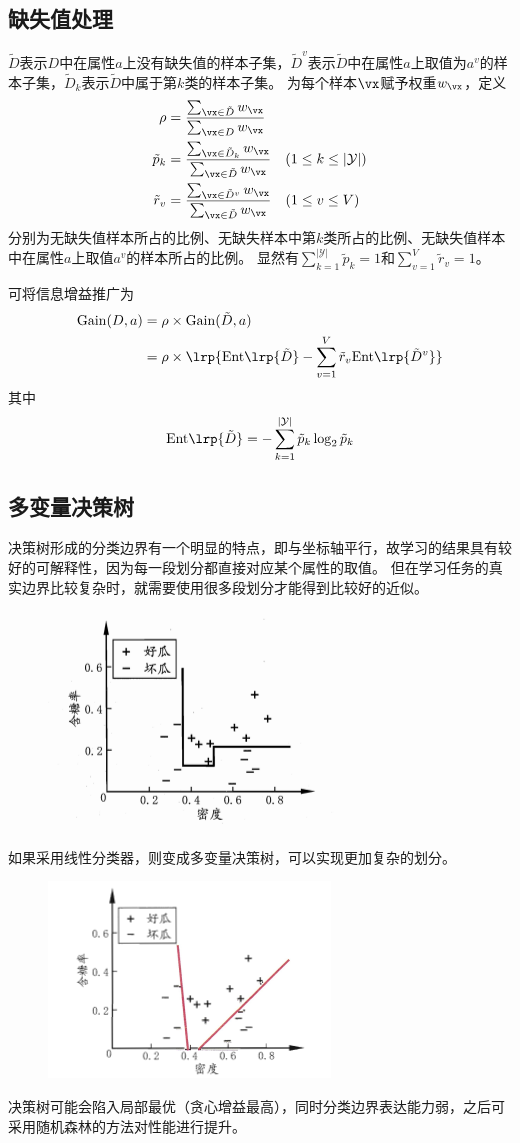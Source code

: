 \subsection{缺失值处理}
$\tilde{D}$表示$D$中在属性$a$上没有缺失值的样本子集，$\tilde{D}^v$表示$\tilde{D}$中在属性$a$上取值为$a^v$的样本子集，$\tilde{D}_k$表示$\tilde{D}$中属于第$k$类的样本子集。
为每个样本$\vx$赋予权重$w_\vx$，定义
\[\begin{aligned}
\rho &= \frac{\sum_{\vx\in\tilde{D}}w_{\vx}}{\sum_{\vx\in D}w_{\vx}}\\
\tilde{p}_k &= \frac{\sum_{\vx\in\tilde{D}_k}w_{\vx}}{\sum_{\vx\in\tilde{D}}w_{\vx}}\quad(1\leq k\leq |\mathcal{Y}|)\\
\tilde{r}_v &= \frac{\sum_{\vx\in\tilde{D}^v}w_{\vx}}{\sum_{\vx\in\tilde{D}}w_{\vx}}\quad(1\leq v\leq V)
\end{aligned}\]
分别为无缺失值样本所占的比例、无缺失样本中第$k$类所占的比例、无缺失值样本中在属性$a$上取值$a^v$的样本所占的比例。
显然有$\sum_{k=1}^{|\mathcal{Y}|}\tilde{p}_k=1$和$\sum_{v=1}^V\tilde{r}_v=1$。

可将信息增益推广为
\[\begin{aligned}
\mathrm{Gain}(D,a) &= \rho\times \mathrm{Gain}(\tilde{D},a)\\
&= \rho\times\lrp{\mathrm{Ent}\lrp{\tilde{D}}-\sum_{v=1}^V\tilde{r}_v\mathrm{Ent}\lrp{\tilde{D}^v}}
\end{aligned}\]
其中
\[\mathrm{Ent}\lrp{\tilde{D}}=-\sum_{k=1}^{|\mathcal{Y}|}\tilde{p}_k\log_2\tilde{p}_k\]

\subsection{多变量决策树}
决策树形成的分类边界有一个明显的特点，即与坐标轴平行，故学习的结果具有较好的可解释性，因为每一段划分都直接对应某个属性的取值。
但在学习任务的真实边界比较复杂时，就需要使用很多段划分才能得到比较好的近似。
\begin{figure}[H]
\centering
\includegraphics[width=0.4\linewidth]{fig/DT-boundary.png}
\end{figure}

如果采用线性分类器，则变成多变量决策树，可以实现更加复杂的划分。
\begin{figure}[H]
\centering
\includegraphics[width=0.4\linewidth]{fig/multivar-DT.png}
\end{figure}

决策树可能会陷入局部最优（贪心增益最高），同时分类边界表达能力弱，之后可采用随机森林的方法对性能进行提升。